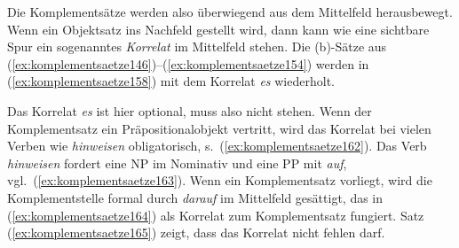 \begin{exe}
  \ex\label{ex:komplementsaetze146}
  \begin{xlist}
  \end{xlist}

  \ex\label{ex:komplementsaetze150}
  \begin{xlist}
  \end{xlist}
  \ex\label{ex:komplementsaetze154}
  \begin{xlist}
  \end{xlist}
\end{exe}

Die Komplementsätze werden also überwiegend aus dem Mittelfeld herausbewegt.
Wenn ein Objektsatz ins Nachfeld gestellt wird, dann kann wie eine sichtbare Spur ein sogenanntes \textit{Korrelat} im Mittelfeld stehen.
Die (b)-Sätze aus (\ref{ex:komplementsaetze146})--(\ref{ex:komplementsaetze154}) werden in (\ref{ex:komplementsaetze158}) mit dem Korrelat \textit{es} wiederholt.

\begin{exe}
  \ex\label{ex:komplementsaetze158}
  \begin{xlist}
  \end{xlist}
\end{exe}

Das Korrelat \textit{es} ist hier optional, muss also nicht stehen.
Wenn der Komplementsatz ein Präpositionalobjekt vertritt, wird das Korrelat bei vielen Verben wie \textit{hinweisen} obligatorisch, s.\ (\ref{ex:komplementsaetze162}).
Das Verb \textit{hinweisen} fordert eine NP im Nominativ und eine PP mit \textit{auf}, vgl.\ (\ref{ex:komplementsaetze163}).
Wenn ein Komplementsatz vorliegt, wird die Komplementstelle formal durch \textit{darauf} im Mittelfeld gesättigt, das in (\ref{ex:komplementsaetze164}) als Korrelat zum Komplementsatz fungiert.
Satz (\ref{ex:komplementsaetze165}) zeigt, dass das Korrelat nicht fehlen darf.

